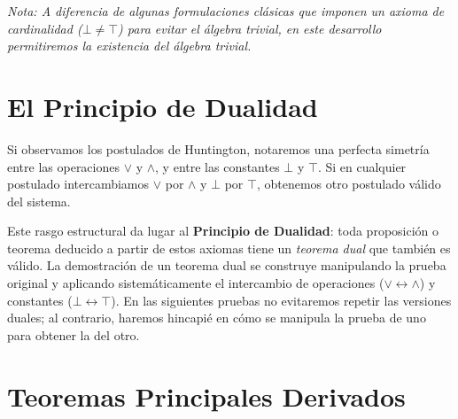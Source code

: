 \documentclass[12pt,a4paper]{article}
\begin{document}
\textit{Nota: A diferencia de algunas formulaciones clásicas que imponen un axioma de cardinalidad ($\bot \neq \top$) para evitar el álgebra trivial, en este desarrollo permitiremos la existencia del álgebra trivial.}

\section{El Principio de Dualidad}
Si observamos los postulados de Huntington, notaremos una perfecta simetría entre las operaciones $\vee$ y $\wedge$, y entre las constantes $\bot$ y $\top$. Si en cualquier postulado intercambiamos $\vee$ por $\wedge$ y $\bot$ por $\top$, obtenemos otro postulado válido del sistema. 

Este rasgo estructural da lugar al \textbf{Principio de Dualidad}: toda proposición o teorema deducido a partir de estos axiomas tiene un \textit{teorema dual} que también es válido. La demostración de un teorema dual se construye manipulando la prueba original y aplicando sistemáticamente el intercambio de operaciones ($\vee \leftrightarrow \wedge$) y constantes ($\bot \leftrightarrow \top$). En las siguientes pruebas no evitaremos repetir las versiones duales; al contrario, haremos hincapié en cómo se manipula la prueba de uno para obtener la del otro.

\section{Teoremas Principales Derivados}
\end{document}
